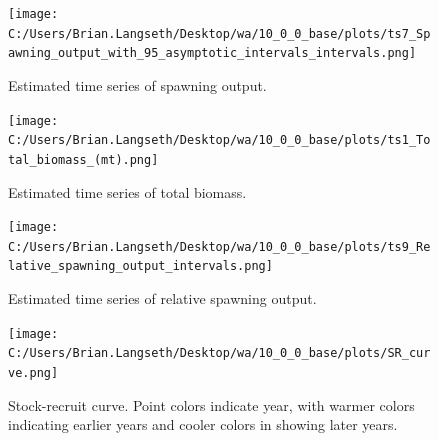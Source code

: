 \documentclass[11pt,
  english,
  a4paper,
]{article}
\begin{document}
\tagmcend\tagstructend


\begin{figure}
\centering
\texttt{[image: C:/Users/Brian.Langseth/Desktop/wa/10\_0\_0\_base/plots/ts7\_Spawning\_output\_with\_95\_asymptotic\_intervals\_intervals.png]}
\caption{Estimated time series of spawning output.\label{fig:ssb}}
\end{figure}

\tagmcend\tagstructend


\begin{figure}
\centering
\texttt{[image: C:/Users/Brian.Langseth/Desktop/wa/10\_0\_0\_base/plots/ts1\_Total\_biomass\_(mt).png]}
\caption{Estimated time series of total biomass.\label{fig:tot-bio}}
\end{figure}

\tagmcend\tagstructend


\begin{figure}
\centering
\texttt{[image: C:/Users/Brian.Langseth/Desktop/wa/10\_0\_0\_base/plots/ts9\_Relative\_spawning\_output\_intervals.png]}
\caption{Estimated time series of relative spawning output.\label{fig:depl}}
\end{figure}

\tagmcend\tagstructend


\begin{figure}
\centering
\texttt{[image: C:/Users/Brian.Langseth/Desktop/wa/10\_0\_0\_base/plots/SR\_curve.png]}
\caption{Stock-recruit curve. Point colors indicate year, with warmer colors indicating earlier years and cooler colors in showing later years.\label{fig:bh-curve}}
\end{figure}

\tagmcend\tagstructend

\end{document}

